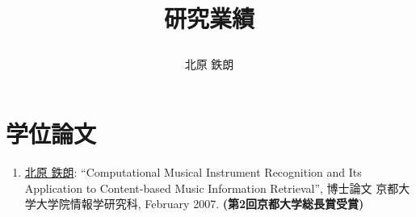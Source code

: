 

\newenvironment{Enumerate}
{\begin{enumerate} \setcounter{enumi}{\thesavedenumi} 
\setlength{\itemsep}{7pt} }
{\setcounter{savedenumi}{\theenumi} \end{enumerate}}

\title{研究業績
  
}
\author{北原 鉄朗}
\date{}


\maketitle


\section*{学位論文}
\begin{Enumerate}
  
\item 
\underline{北原 鉄朗}: 
    ``Computational Musical Instrument Recognition and Its Application to Content-based Music
      Information Retrieval'', 
    博士論文 京都大学大学院情報学研究科, February 2007. 
{\bf (第2回京都大学総長賞受賞)}
\end{Enumerate}

